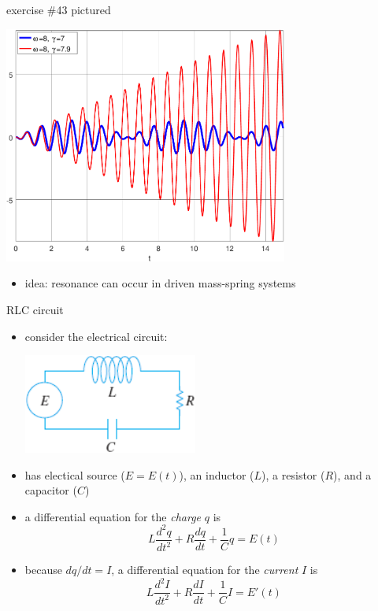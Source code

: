 \documentclass[dvipsnames,colorlinks]{beamer}
\begin{document}
\begin{frame}{exercise \#43 pictured}

\begin{center}
\includegraphics[width=0.7\textwidth]{figs/resonance}
\end{center}

\begin{itemize}
\item idea: \alert{resonance} can occur in driven mass-spring systems
\end{itemize}
\end{frame}



\begin{frame}{RLC circuit}

\begin{itemize}
\item consider the electrical circuit:

\vspace{-3mm}
\hfill \includegraphics[width=0.45\textwidth]{figs/rlc-circuit}
\item has electical source ($E=E(t)$), an inductor ($L$), a resistor ($R$), and a capacitor ($C$)
\item a differential equation for the \emph{charge} $q$ is
    $$L \frac{d^2q}{dt^2} + R \frac{dq}{dt} + \frac{1}{C} q=E(t)$$
\item because $dq/dt = I$, a differential equation for the \emph{current} $I$ is
    $$L \frac{d^2I}{dt^2} + R \frac{dI}{dt} + \frac{1}{C} I=E'(t)$$
\end{itemize}
\end{frame}
\end{document}
